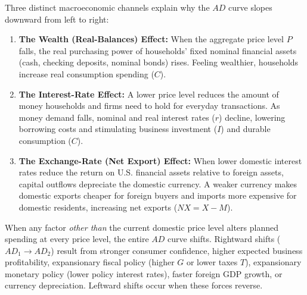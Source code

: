 \documentclass[11pt,letterpaper]{article}
\begin{document}
Three distinct macroeconomic channels explain why the $AD$ curve slopes downward from left to right:
\begin{enumerate}
    \item \textbf{The Wealth (Real-Balances) Effect:} When the aggregate price level $P$ falls, the real purchasing power of households' fixed nominal financial assets (cash, checking deposits, nominal bonds) rises. Feeling wealthier, households increase real consumption spending ($C$).
    \item \textbf{The Interest-Rate Effect:} A lower price level reduces the amount of money households and firms need to hold for everyday transactions. As money demand falls, nominal and real interest rates ($r$) decline, lowering borrowing costs and stimulating business investment ($I$) and durable consumption ($C$).
    \item \textbf{The Exchange-Rate (Net Export) Effect:} When lower domestic interest rates reduce the return on U.S. financial assets relative to foreign assets, capital outflows depreciate the domestic currency. A weaker currency makes domestic exports cheaper for foreign buyers and imports more expensive for domestic residents, increasing net exports ($NX = X - M$).
\end{enumerate}

When any factor \emph{other than} the current domestic price level alters planned spending at every price level, the entire $AD$ curve shifts. Rightward shifts ($AD_1 \rightarrow AD_2$) result from stronger consumer confidence, higher expected business profitability, expansionary fiscal policy (higher $G$ or lower taxes $T$), expansionary monetary policy (lower policy interest rates), faster foreign GDP growth, or currency depreciation. Leftward shifts occur when these forces reverse.
\end{document}
